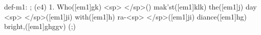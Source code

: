 def-m1: \grealign;
(c4) 1. Who([em1]gk) <sp> </sp>() mak'st([em1]klk) the([em1]j) day <sp> </sp>([em1]ji) with([em1]h) ra-<sp> </sp>([em1]ji) diance([em1]hg) bright,([em1]ghggv) (;)